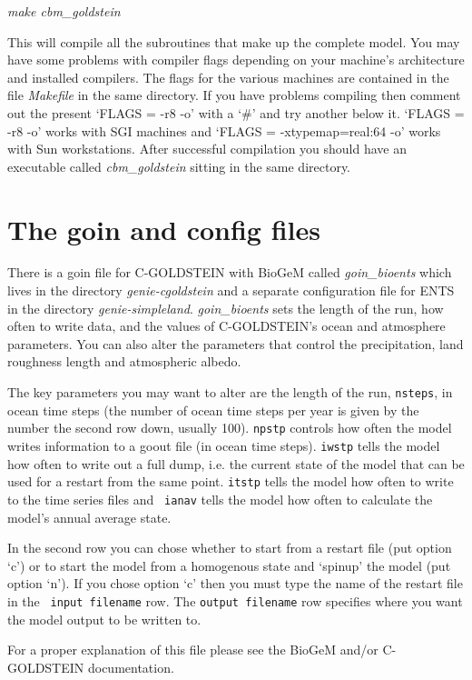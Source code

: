 \documentclass[10pt,a4paper]{report}
\begin{document}
{\em make cbm\_goldstein}

This will compile all the subroutines that make up the complete
model. You may have some problems with compiler flags depending on
your machine's architecture and installed compilers. The flags for
the various machines are contained in the file {\em Makefile} in the
same directory. If you have problems compiling then comment out the
present `FLAGS = -r8 -o' with a `\#' and try another below it.
`FLAGS = -r8 -o' works with SGI machines and `FLAGS =
-xtypemap=real:64 -o' works with Sun workstations. After successful
compilation you should have an executable called {\em
cbm\_goldstein} sitting in the same directory.

\section{The goin and config files}

There is a goin file for C-GOLDSTEIN with BioGeM called {\em
goin\_bioents} which lives in the directory {\em genie-cgoldstein}
and a separate configuration file for ENTS in the directory {\em
genie-simpleland}. {\em goin\_bioents} sets the length of the run,
how often to write data, and the values of C-GOLDSTEIN's ocean and
atmosphere parameters. You can also alter the parameters that
control the precipitation, land roughness length and atmospheric
albedo.

The key parameters you may want to alter are the length of the run,
{\tt nsteps}, in ocean time steps (the number of ocean time steps
per year is given by the number the second row down, usually 100).
{\tt npstp} controls how often the model writes information to a
goout file (in ocean time steps). {\tt iwstp} tells the model how
often to write out a full dump, i.e. the current state of the model
that can be used for a restart from the same point. {\tt itstp}
tells the model how often to write to the time series files and {\tt
ianav} tells the model how often to calculate the model's annual
average state.

In the second row you can chose whether to start from a restart
file (put option `c') or to start the model from a homogenous
state and `spinup' the model (put option `n'). If you chose option
`c' then you must type the name of the restart file in the {\tt
input filename} row. The {\tt output filename} row specifies where
you want the model output to be written to.

For a proper explanation of this file please see the BioGeM and/or
C-GOLDSTEIN documentation.
\end{document}

